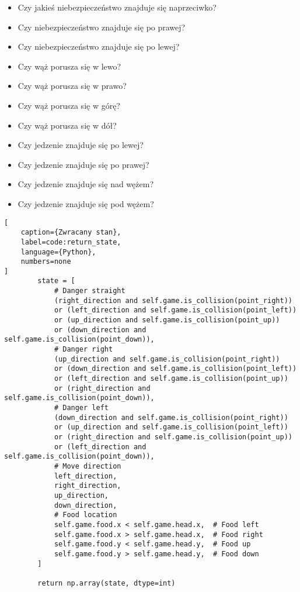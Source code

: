 \begin{itemize}
    \item Czy jakieś niebezpieczeństwo znajduje się naprzeciwko?
    \item Czy niebezpieczeństwo znajduje się po prawej?
    \item Czy niebezpieczeństwo znajduje się po lewej?
    \item Czy wąż porusza się w lewo?
    \item Czy wąż porusza się w prawo?
    \item Czy wąż porusza się w górę?
    \item Czy wąż porusza się w dół?
    \item Czy jedzenie znajduje się po lewej?
    \item Czy jedzenie znajduje się po prawej?
    \item Czy jedzenie znajduje się nad wężem?
    \item Czy jedzenie znajduje się pod wężem?
\end{itemize}


\begin{onepage}
    \begin{lstlisting}[
    caption={Zwracany stan},
    label=code:return_state,
    language={Python},
    numbers=none
]
        state = [
            # Danger straight
            (right_direction and self.game.is_collision(point_right))
            or (left_direction and self.game.is_collision(point_left))
            or (up_direction and self.game.is_collision(point_up))
            or (down_direction and self.game.is_collision(point_down)),
            # Danger right
            (up_direction and self.game.is_collision(point_right))
            or (down_direction and self.game.is_collision(point_left))
            or (left_direction and self.game.is_collision(point_up))
            or (right_direction and self.game.is_collision(point_down)),
            # Danger left
            (down_direction and self.game.is_collision(point_right))
            or (up_direction and self.game.is_collision(point_left))
            or (right_direction and self.game.is_collision(point_up))
            or (left_direction and self.game.is_collision(point_down)),
            # Move direction
            left_direction,
            right_direction,
            up_direction,
            down_direction,
            # Food location
            self.game.food.x < self.game.head.x,  # Food left
            self.game.food.x > self.game.head.x,  # Food right
            self.game.food.y < self.game.head.y,  # Food up
            self.game.food.y > self.game.head.y,  # Food down
        ]

        return np.array(state, dtype=int)
    \end{lstlisting}
\end{onepage}

